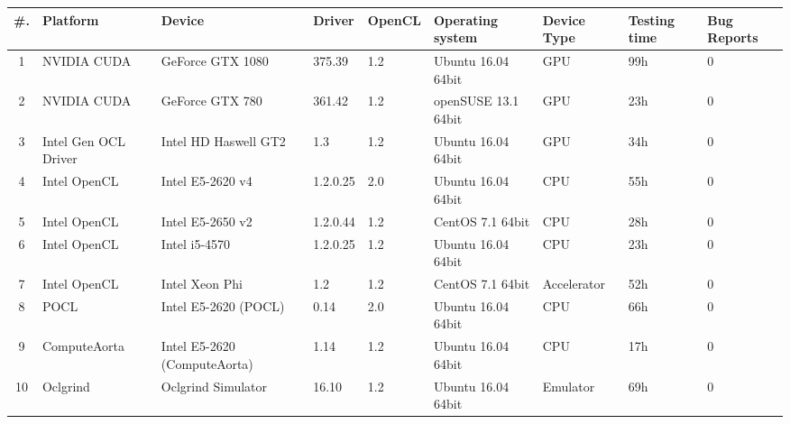 \begin{tabular}{ cllllll | ll }
\toprule
\textbf{\#. } & \textbf{Platform} & \textbf{Device} & \textbf{Driver} & \textbf{OpenCL} & 
\textbf{Operating system} & \textbf{Device Type} & \textbf{Testing time} & \textbf{Bug Reports} \\
\midrule
1 & NVIDIA CUDA & GeForce GTX 1080 & 375.39 & 1.2 & Ubuntu 16.04 64bit & GPU & 99h & 0 \\
2 & NVIDIA CUDA & GeForce GTX 780 & 361.42 & 1.2 & openSUSE  13.1 64bit & GPU & 23h & 0 \\
3 & Intel Gen OCL Driver & Intel HD Haswell GT2 & 1.3 & 1.2 & Ubuntu 16.04 64bit & GPU & 34h & 0 \\
4 & Intel OpenCL & Intel E5-2620 v4 & 1.2.0.25 & 2.0 & Ubuntu 16.04 64bit & CPU & 55h & 0 \\
5 & Intel OpenCL & Intel E5-2650 v2 & 1.2.0.44 & 1.2 & CentOS 7.1 64bit & CPU & 28h & 0 \\
6 & Intel OpenCL & Intel i5-4570 & 1.2.0.25 & 1.2 & Ubuntu 16.04 64bit & CPU & 23h & 0 \\
7 & Intel OpenCL & Intel Xeon Phi & 1.2 & 1.2 & CentOS 7.1 64bit & Accelerator & 52h & 0 \\
8 & POCL & Intel E5-2620 (POCL) & 0.14 & 2.0 & Ubuntu 16.04 64bit & CPU & 66h & 0 \\
9 & ComputeAorta & Intel E5-2620 (ComputeAorta) & 1.14 & 1.2 & Ubuntu 16.04 64bit & CPU & 17h & 0 \\
10 & Oclgrind & Oclgrind Simulator & 16.10 & 1.2 & Ubuntu 16.04 64bit & Emulator & 69h & 0 \\

\bottomrule
\end{tabular}

